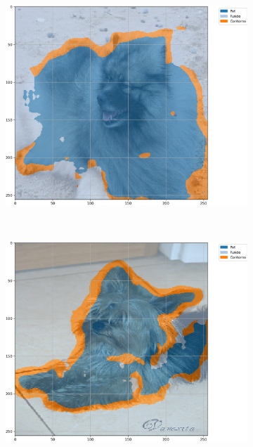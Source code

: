 \begin{figure}[H]
    \centering
    \caption[Segmentação com U-Net, BPCAPooling, 500 épocas, \textit{Oxford-IIIT Pets}, mIoU]{Exemplos segmentados a partir de U-Net com BPCAPooling e 500 épocas no conjunto de dados \textit{Oxford-IIIT Pets} baseada em mIoU.}
    \label{results:fig:semantic:3}
     \begin{subfigure}[t]{0.32\textwidth}
         \centering
         \includegraphics[width=1\linewidth]{recursos/imagens/results/bpca_miou_unet500_image_0_overlayed_segmentation.png}
         \label{results:fig:semantic:3.1}
     \end{subfigure}%
     ~ 
     \begin{subfigure}[t]{0.32\textwidth}
         \centering
         \includegraphics[width=1\linewidth]{recursos/imagens/results/bpca_miou_unet500_image_1_overlayed_segmentation.png}

\end{subfigure}
\end{figure}
